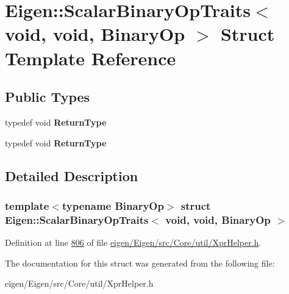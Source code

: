 \hypertarget{struct_eigen_1_1_scalar_binary_op_traits_3_01void_00_01void_00_01_binary_op_01_4}{}\section{Eigen\+:\+:Scalar\+Binary\+Op\+Traits$<$ void, void, Binary\+Op $>$ Struct Template Reference}
\label{struct_eigen_1_1_scalar_binary_op_traits_3_01void_00_01void_00_01_binary_op_01_4}
\subsection*{Public Types}
\begin{DoxyCompactItemize}
\item 
\mbox{\label{struct_eigen_1_1_scalar_binary_op_traits_3_01void_00_01void_00_01_binary_op_01_4_ada3e378d2e165f502226f4512e180cb4}} 
typedef void {\bfseries Return\+Type}
\item 
\mbox{\label{struct_eigen_1_1_scalar_binary_op_traits_3_01void_00_01void_00_01_binary_op_01_4_ada3e378d2e165f502226f4512e180cb4}} 
typedef void {\bfseries Return\+Type}
\end{DoxyCompactItemize}


\subsection{Detailed Description}
\subsubsection*{template$<$typename Binary\+Op$>$\newline
struct Eigen\+::\+Scalar\+Binary\+Op\+Traits$<$ void, void, Binary\+Op $>$}



Definition at line \hyperlink{eigen_2_eigen_2src_2_core_2util_2_xpr_helper_8h_source_l00806}{806} of file \hyperlink{eigen_2_eigen_2src_2_core_2util_2_xpr_helper_8h_source}{eigen/\+Eigen/src/\+Core/util/\+Xpr\+Helper.\+h}.



The documentation for this struct was generated from the following file\+:\begin{DoxyCompactItemize}
\item 
eigen/\+Eigen/src/\+Core/util/\+Xpr\+Helper.\+h\end{DoxyCompactItemize}
